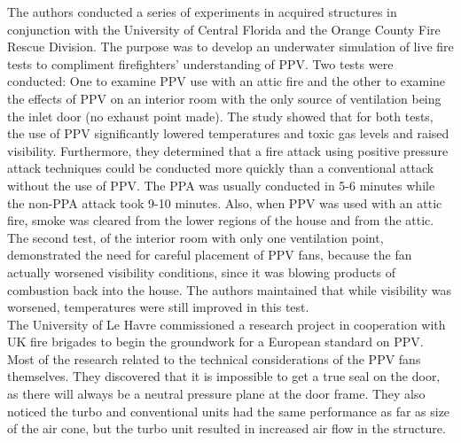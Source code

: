 \documentclass{article}
\begin{document}
The authors conducted a series of experiments in acquired structures in conjunction with the University of Central Florida and the Orange County Fire Rescue Division. The purpose was to develop an underwater simulation of live fire tests to compliment firefighters’ understanding of PPV. Two tests were conducted: One to examine PPV use with an attic fire and the other to examine the effects of PPV on an interior room with the only source of ventilation being the inlet door (no exhaust point made). The study showed that for both tests, the use of PPV significantly lowered temperatures and toxic gas levels and raised visibility. Furthermore, they determined that a fire attack using positive pressure attack techniques could be conducted more quickly than a conventional attack without the use of PPV. The PPA was usually conducted in 5-6 minutes while the non-PPA attack took 9-10 minutes. Also, when PPV was used with an attic fire, smoke was cleared from the lower regions of the house and from the attic. The second test, of the interior room with only one ventilation point, demonstrated the need for careful placement of PPV fans, because the fan actually worsened visibility conditions, since it was blowing products of combustion back into the house. The authors maintained that while visibility was worsened, temperatures were still improved in this test.\cite{AdvancesinPPV}\\
	
The University of Le Havre commissioned a research project in cooperation with UK fire brigades to begin the groundwork for a European standard on PPV. Most of the research related to the technical considerations of the PPV fans themselves. They discovered that it is impossible to get a true seal on the door, as there will always be a neutral pressure plane at the door frame. They also noticed the turbo and conventional units had the same performance as far as size of the air cone, but the turbo unit resulted in increased air flow in the structure.\cite{LeHavrePPV}\\
	
\end{document}
